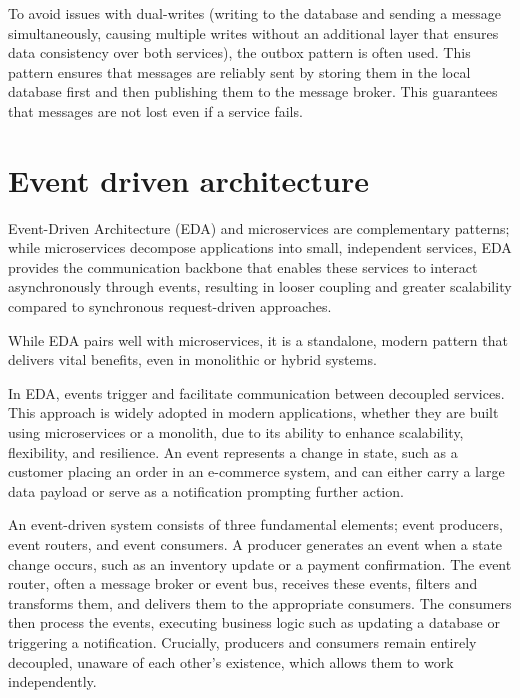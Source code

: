 \documentclass[]{final}
\begin{document}
To avoid issues with dual-writes (writing to the database and sending a message
simultaneously, causing multiple writes without an additional layer that
ensures data consistency over both services), the outbox pattern is often used.
This pattern ensures that messages are reliably sent by storing them in the
local database first and then publishing them to the message broker. This
guarantees that messages are not lost even if a service fails.

\section{Event driven architecture}

Event-Driven Architecture (EDA) and microservices are complementary patterns;
while microservices decompose applications into small, independent services,
EDA provides the communication backbone that enables these services to
interact asynchronously through events, resulting in looser coupling and
greater scalability compared to synchronous request-driven approaches.

While EDA pairs well with microservices, it is a standalone, modern
pattern that delivers vital benefits, even in monolithic or hybrid systems.


In EDA, events trigger and facilitate communication between decoupled services.
This approach is widely adopted in modern applications, whether they are built
using microservices or a monolith, due to its ability to enhance scalability,
flexibility, and resilience. An event represents a change in state, such
as a customer placing an order in an e-commerce system, and can either
carry a large data payload or serve as a notification prompting further
action.

An event-driven system consists of three fundamental elements; event producers,
event routers, and event consumers. A producer generates an event when a
state change occurs, such as an inventory update or a payment confirmation.
The event router, often a message broker or event bus, receives these
events, filters and transforms them, and delivers them to the appropriate
consumers. The consumers then process the events, executing business logic
such as updating a database or triggering a notification. Crucially,
producers and consumers remain entirely decoupled, unaware of each other’s
existence, which allows them to work independently.
\end{document}
